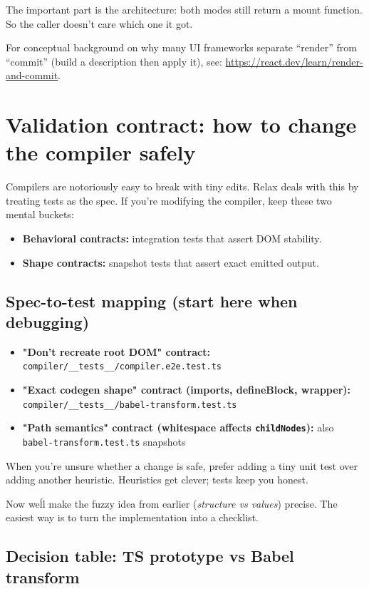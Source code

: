 The important part is the architecture: both modes still return a mount function.
So the caller doesn't care which one it got.

For conceptual background on why many UI frameworks separate ``render'' from ``commit'' (build a description then apply it), see:
\href{https://react.dev/learn/render-and-commit}{https://react.dev/learn/render-and-commit}.

\section{Validation contract: how to change the compiler safely}

Compilers are notoriously easy to break with tiny edits.
Relax deals with this by treating tests as the spec.
If you're modifying the compiler, keep these two mental buckets:

\begin{itemize}
\item \textbf{Behavioral contracts:} integration tests that assert DOM stability.
\item \textbf{Shape contracts:} snapshot tests that assert exact emitted output.
\end{itemize}

\subsection{Spec-to-test mapping (start here when debugging)}

\begin{itemize}
\item \textbf{"Don't recreate root DOM" contract:} \texttt{compiler/\_\_tests\_\_/compiler.e2e.test.ts}
\item \textbf{"Exact codegen shape" contract (imports, defineBlock, wrapper):} \texttt{compiler/\_\_tests\_\_/babel-transform.test.ts}
\item \textbf{"Path semantics" contract (whitespace affects \texttt{childNodes}):} also \texttt{babel-transform.test.ts} snapshots
\end{itemize}

When you're unsure whether a change is safe, prefer adding a tiny unit test over adding another heuristic.
Heuristics get clever; tests keep you honest.

Now we\'ll make the fuzzy idea from earlier (\emph{structure vs values}) precise.
The easiest way is to turn the implementation into a checklist.

\subsection{Decision table: TS prototype vs Babel transform}

